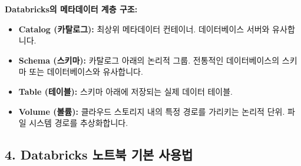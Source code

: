 \documentclass[11pt,a4paper]{article}
\theoremstyle{definition}
\begin{document}
\begin{infobox}
\textbf{Databricks의 메타데이터 계층 구조:}
\begin{itemize}
    \item \textbf{Catalog (카탈로그):} 최상위 메타데이터 컨테이너. 데이터베이스 서버와 유사합니다.
    \item \textbf{Schema (스키마):} 카탈로그 아래의 논리적 그룹. 전통적인 데이터베이스의 스키마 또는 데이터베이스와 유사합니다.
    \item \textbf{Table (테이블):} 스키마 아래에 저장되는 실제 데이터 테이블.
    \item \textbf{Volume (볼륨):} 클라우드 스토리지 내의 특정 경로를 가리키는 논리적 단위. 파일 시스템 경로를 추상화합니다.
\end{itemize}
\end{infobox}

\subsection*{4. Databricks 노트북 기본 사용법}
\end{document}
